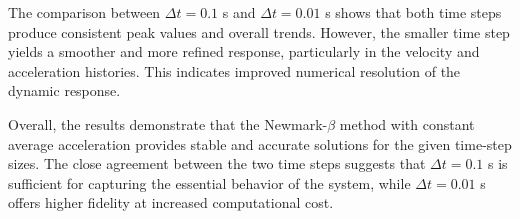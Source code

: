 The comparison between $\Delta t = 0.1$ s and $\Delta t = 0.01$ s shows that both
time steps produce consistent peak values and overall trends. However, the
smaller time step yields a smoother and more refined response, particularly in
the velocity and acceleration histories. This indicates improved numerical
resolution of the dynamic response.

Overall, the results demonstrate that the Newmark-$\beta$ method with constant
average acceleration provides stable and accurate solutions for the given
time-step sizes. The close agreement between the two time steps suggests that
$\Delta t = 0.1$ s is sufficient for capturing the essential behavior of the
system, while $\Delta t = 0.01$ s offers higher fidelity at increased
computational cost.